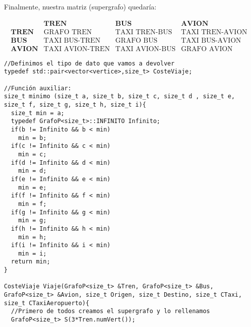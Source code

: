 Finalmente, nuestra matriz (supergrafo) quedaría:

\[
\begin{array}{c|c|c|c}
      & \textbf{TREN} & \textbf{BUS} & \textbf{AVION}  \\
      \hline
\textbf{TREN} & \text{GRAFO TREN} & \text{TAXI TREN-BUS} & \text{TAXI TREN-AVION} \\
      \hline
\textbf{BUS}  & \text{TAXI BUS-TREN} & \text{GRAFO BUS} & \text{TAXI BUS-AVION} \\
      \hline
\textbf{AVION} & \text{TAXI AVION-TREN} & \text{TAXI AVION-BUS} & \text{GRAFO AVION}
\end{array}
\]

\begin{verbatim}
//Definimos el tipo de dato que vamos a devolver
typedef std::pair<vector<vertice>,size_t> CosteViaje;

//Función auxiliar:
size_t minimo (size_t a, size_t b, size_t c, size_t d , size_t e, size_t f, size_t g, size_t h, size_t i){
  size_t min = a;
  typedef GrafoP<size_t>::INFINITO Infinito;
  if(b != Infinito && b < min)
    min = b;
  if(c != Infinito && c < min)
    min = c;
  if(d != Infinito && d < min)
    min = d;
  if(e != Infinito && e < min)
    min = e;
  if(f != Infinito && f < min)
    min = f;
  if(g != Infinito && g < min)
    min = g;
  if(h != Infinito && h < min)
    min = h;
  if(i != Infinito && i < min)
    min = i;
  return min;
}

CosteViaje Viaje(GrafoP<size_t> &Tren, GrafoP<size_t> &Bus, GrafoP<size_t> &Avion, size_t Origen, size_t Destino, size_t CTaxi, size_t CTaxiAeropuerto){
  //Primero de todos creamos el supergrafo y lo rellenamos
  GrafoP<size_t> S(3*Tren.numVert());


\end{verbatim}
